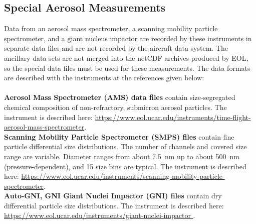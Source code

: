 \subsection{Special Aerosol Measurements}
\begin{hangparagraphs}
Data from an aerosol mass spectrometer,
a scanning mobility particle spectrometer, and a giant
nucleus impactor are recorded by these
instruments in separate data files and are not recorded by the aircraft
data system. The ancillary data
sets are not merged into the netCDF archives produced by EOL, so the
special data files must be used for these measurements. The data formats
are described with the instruments at the references given below:\\
\\
\textbf{Aerosol Mass Spectrometer (AMS) data files} contain size-segregated
chemical composition of non-refractory, submicron aerosol particles.
The instrument is described here: \href{https://www.eol.ucar.edu/instruments/time-flight-aerosol-mass-spectrometer}{https://www.eol.ucar.edu/instruments/time-flight-aerosol-mass-spectrometer}.\\
\textbf{Scanning Mobility Particle Spectrometer (SMPS) files} contain
fine particle differential size distributions. The number of channels
and covered size range are variable. Diameter ranges from about 7.5~nm
up to about 500~nm (pressure-dependent), and 15 size bins are typical.
The instrument is described here: \href{https://www.eol.ucar.edu/instruments/scanning-mobility-particle-spectrometer}{https://www.eol.ucar.edu/instruments/scanning-mobility-particle-spectrometer}.\\
\textbf{Auto-GNI, GNI Giant Nuclei Impactor (GNI) files} contain dry
differential particle size distributions. The instrument is described
here: \href{https://www.eol.ucar.edu/instruments/giant-nuclei-impactor\%20}{https://www.eol.ucar.edu/instruments/giant-nuclei-impactor }.
\end{hangparagraphs}


